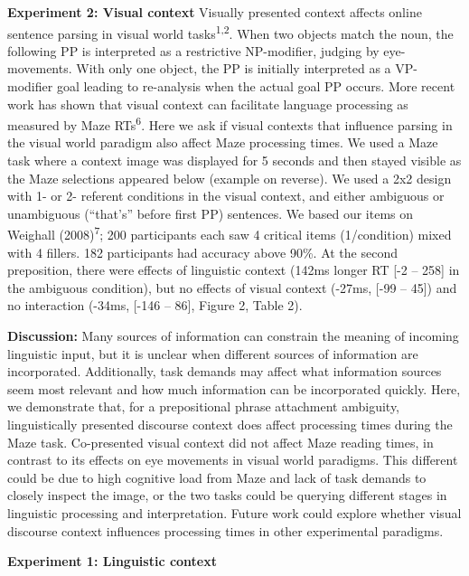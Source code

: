 \documentclass[11pt,a4paper]{article}
\begin{document}
	\noindent\textbf{Experiment 2: Visual context} Visually presented context affects online sentence parsing in visual world tasks\textsuperscript{1,2}. When two objects match the noun, the following PP is interpreted as a restrictive NP-modifier, judging by eye-movements. With only one object, the PP is initially interpreted as a VP-modifier goal leading to re-analysis when the actual goal PP occurs. More recent work has shown that visual context can facilitate language processing as measured by Maze RTs\textsuperscript{6}. Here we ask if visual contexts that influence parsing in the visual world paradigm also affect Maze processing times. We used a Maze task where a context image was displayed for 5 seconds and then stayed visible as the Maze selections appeared below (example on reverse). We used a 2x2 design with 1- or 2- referent conditions in the visual context, and either ambiguous or unambiguous (``that's'' before first PP) sentences. We based our items on Weighall (2008)\textsuperscript{7}; 200 participants each saw 4 critical items (1/condition) mixed with 4 fillers. 182 participants had accuracy above 90\%. At the second preposition, there were effects of linguistic context (142ms longer RT  [-2 -- 258] in the ambiguous condition), but no effects of visual context (-27ms, [-99 -- 45]) and no interaction (-34ms, [-146 -- 86], Figure 2, Table 2). 
	
	\noindent\textbf{Discussion:} Many sources of information can constrain the meaning of incoming linguistic input, but it is unclear when different sources of information are incorporated.  Additionally, task demands may affect what information sources seem most relevant and how much information can be incorporated quickly. Here, we demonstrate that, for a prepositional phrase attachment ambiguity, linguistically presented discourse context does affect processing times during the Maze task. Co-presented visual context did not affect Maze reading times, in contrast to its effects on eye movements in visual world paradigms. This different could be due to high cognitive load from Maze and lack of task demands to closely inspect the image, or the two tasks could be querying different stages in linguistic processing and interpretation. Future work could explore whether visual discourse context influences processing times in other experimental paradigms. 
	

	
	
	\newpage
	
	
	\begin{center}\textbf{Experiment 1: Linguistic context}\end{center}
	
\end{document}
